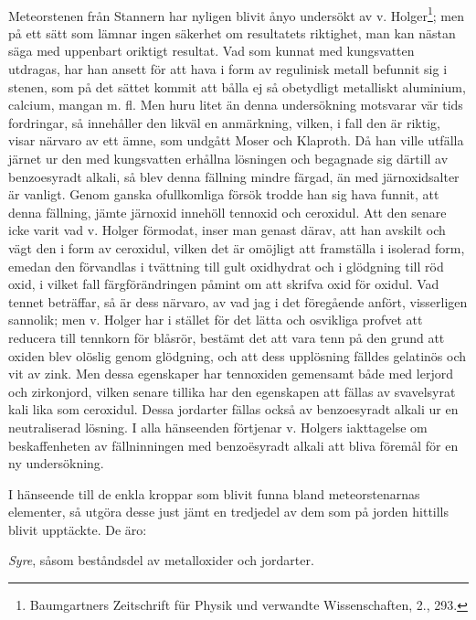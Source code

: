 \documentclass[a4paper, 12pt, oneside, swedish]{article}
\begin{document}
\paragraph{}
Meteorstenen från Stannern har nyligen blivit ånyo undersökt av v. Holger\footnote{Baumgartners Zeitschrift für Physik und verwandte Wissenschaften, 2., 293.}; men på ett sätt som lämnar ingen säkerhet om resultatets riktighet, man kan nästan säga med uppenbart oriktigt resultat. Vad som kunnat med kungsvatten utdragas, har han ansett för att hava i form av regulinisk metall befunnit sig i stenen, som på det sättet kommit att bålla ej så obetydligt metalliskt aluminium, calcium, mangan m. fl. Men huru litet än denna undersökning motsvarar vär tids fordringar, så innehåller den likväl en anmärkning, vilken, i fall den är riktig, visar närvaro av ett ämne, som undgått Moser och Klaproth. Då han ville utfälla järnet ur den med kungsvatten erhållna lösningen och begagnade sig därtill av benzoesyradt alkali, så blev denna fällning mindre färgad, än med järnoxidsalter är vanligt. Genom ganska ofullkomliga försök trodde han sig hava funnit, att denna fällning, jämte järnoxid innehöll tennoxid och ceroxidul. Att den senare icke varit vad v. Holger förmodat, inser man genast därav, att han avskilt och vägt den i form av ceroxidul, vilken det är omöjligt att framställa i isolerad form, emedan den förvandlas i tvättning till gult oxidhydrat och i glödgning till röd oxid, i vilket fall färgförändringen påmint om att skrifva oxid för oxidul. Vad tennet beträffar, så är dess närvaro, av vad jag i det föregående anfört, visserligen sannolik; men v. Holger har i stället för det lätta och osvikliga profvet att reducera till tennkorn för blåsrör, bestämt det att vara tenn på den grund att oxiden blev olöslig genom glödgning, och att dess upplösning fälldes gelatinös och vit av zink. Men dessa egenskaper har tennoxiden gemensamt både med lerjord och zirkonjord, vilken senare tillika har den egenskapen att fällas av svavelsyrat kali lika som ceroxidul. Dessa jordarter fällas också av benzoesyradt alkali ur en neutraliserad lösning. I alla hänseenden förtjenar v. Holgers iakttagelse om beskaffenheten av fällninningen med benzoësyradt alkali att bliva föremål för en ny undersökning.

I hänseende till de enkla kroppar som blivit funna bland meteorstenarnas elementer, så utgöra desse just jämt en tredjedel av dem som på jorden hittills blivit upptäckte. De äro:

\emph{Syre}, såsom beståndsdel av metalloxider och jordarter.
\end{document}
